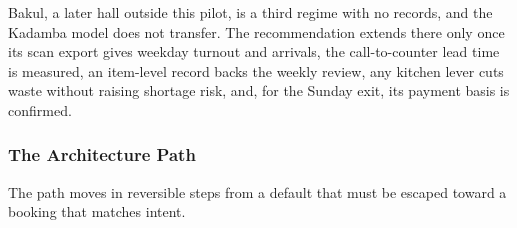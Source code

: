 \documentclass[
  10pt,
  table]{article}
\begin{document}
Bakul, a later hall outside this pilot, is a third regime with no records, and the Kadamba model does not transfer. The recommendation extends there only once its scan export gives weekday turnout and arrivals, the call-to-counter lead time is measured, an item-level record backs the weekly review, any kitchen lever cuts waste without raising shortage risk, and, for the Sunday exit, its payment basis is confirmed.

\subsubsection{The Architecture Path}\label{the-architecture-path}

The path moves in reversible steps from a default that must be escaped toward a booking that matches intent.
\end{document}
